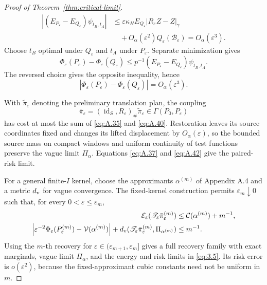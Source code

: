 \begin{proof}[Proof of Theorem~\ref{thm:critical-limit}]
\begin{equation}
\begin{aligned}
|(E_{P_\varepsilon}-E_{Q_\varepsilon})\psi_{t_B,t_A}|
&\le\varepsilon\kappa_HE_{Q_\varepsilon}|R_\varepsilon Z-Z|_\gamma\\
&\quad+O_\alpha(\varepsilon^2)Q_\varepsilon(\mathcal B_\varepsilon)
=O_\alpha(\varepsilon^3).
\end{aligned}
\tag{A.41}\label{eq:A.41}
\end{equation}
Choose \(t_B\) optimal under \(Q_\varepsilon\) and \(t_A\) under \(P_\varepsilon\). Separate minimization gives
\[
\Phi_\varepsilon(P_\varepsilon)-\Phi_\varepsilon(Q_\varepsilon)
\le p^{-1}(E_{P_\varepsilon}-E_{Q_\varepsilon})\psi_{t_B,t_A}.
\]
The reversed choice gives the opposite inequality, hence
\begin{equation}
|\Phi_\varepsilon(P_\varepsilon)-\Phi_\varepsilon(Q_\varepsilon)|
=O_\alpha(\varepsilon^3).
\tag{A.42}\label{eq:A.42}
\end{equation}

With \(\widetilde\pi_\varepsilon\) denoting the preliminary translation plan, the coupling
\[
\bar\pi_\varepsilon=(\operatorname{id}_S,R_\varepsilon)_\#\widetilde\pi_\varepsilon
\in\Gamma(P_0,P_\varepsilon)
\]
has cost at most the sum of \eqref{eq:A.35} and \eqref{eq:A.40}. Restoration leaves its source coordinates fixed and changes its lifted displacement by \(O_\alpha(\varepsilon)\), so the bounded source mass on compact windows and uniform continuity of test functions preserve the vague limit \(\Pi_\alpha\). Equations \eqref{eq:A.37} and \eqref{eq:A.42} give the paired-risk limit.

For a general finite-\(I\) kernel, choose the approximants \(\alpha^{(m)}\) of Appendix A.4 and a metric \(d_{\rm v}\) for vague convergence. The fixed-kernel construction permits \(\varepsilon_m\downarrow0\) such that, for every \(0<\varepsilon\le\varepsilon_m\),
\[
\begin{aligned}
\mathcal E_\varepsilon(\mathscr T_\varepsilon\bar\pi_\varepsilon^{(m)})
&\le\mathcal C(\alpha^{(m)})+m^{-1},\\
\left|\varepsilon^{-2}\Phi_\varepsilon(P_\varepsilon^{(m)})-\mathcal V(\alpha^{(m)})\right|
+d_{\rm v}(\mathscr T_\varepsilon\bar\pi_\varepsilon^{(m)},\Pi_{\alpha^{(m)}})
&\le m^{-1}.
\end{aligned}
\]
Using the \(m\)-th recovery for \(\varepsilon\in(\varepsilon_{m+1},\varepsilon_m]\) gives a full recovery family with exact marginals, vague limit \(\Pi_\alpha\), and the energy and risk limits in \eqref{eq:3.5}. Its risk error is \(o(\varepsilon^2)\), because the fixed-approximant cubic constants need not be uniform in \(m\).


\end{proof}
